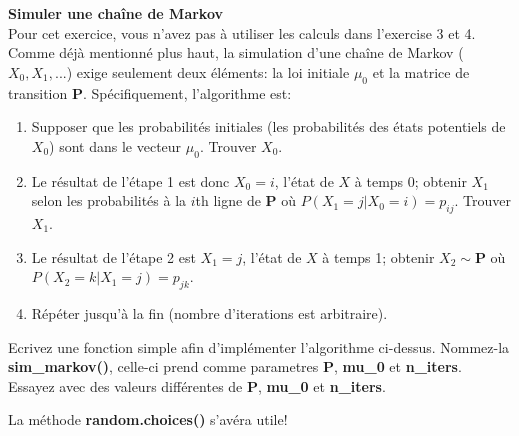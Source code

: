 \begin{Exercice}[20 minutes]\textbf{Simuler une chaîne de Markov}\\
Pour cet exercice, vous n'avez pas à utiliser les calculs dans l'exercise 3 et 4.\\

Comme déjà mentionné plus haut, la simulation d'une chaîne de Markov ($X_0, X_1, ...$) exige seulement deux éléments: la loi initiale $\mu_0$ et la matrice de transition $\mathbf{P}$. Spécifiquement, l'algorithme est:

\begin{enumerate}
    \item Supposer que les probabilités initiales (les probabilités des états potentiels de $X_0$) sont dans le vecteur $\mu_0$. Trouver $X_0$.
    \item Le résultat de l'étape 1 est donc $X_0 = i$, l'état de $X$ à temps 0; obtenir $X_1$ selon les probabilités à la $i$th ligne de $\mathbf{P}$ où $P(X_1=j|X_0=i)=p_{ij}$. Trouver $X_1$.
    \item Le résultat de l'étape 2 est $X_1 = j$, l'état de $X$ à temps 1; obtenir $X_2 \sim \mathbf{P}$ où $P(X_2=k|X_1=j)=p_{jk}$.
    \item Répéter jusqu'à la fin (nombre d'iterations est arbitraire).
\end{enumerate}

Ecrivez une fonction simple afin d'implémenter l'algorithme ci-dessus. Nommez-la \textbf{sim\_markov()}, celle-ci prend comme parametres \textbf{P}, \textbf{mu\_0} et \textbf{n\_iters}. Essayez avec des valeurs différentes de \textbf{P}, \textbf{mu\_0} et \textbf{n\_iters}.



\begin{conseil}
    La méthode \textbf{random.choices()} s'avéra utile!
\end{conseil}
\begin{solution}

\end{solution}
\end{Exercice}

